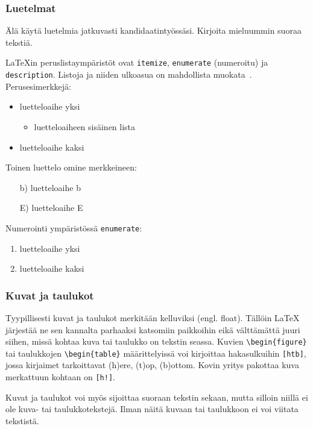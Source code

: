 \subsubsection{Luetelmat}
\label{sec:esimluettelo}

Älä käytä luetelmia jatkuvasti kandidaatintyössäsi. Kirjoita
mieluummin suoraa tekstiä.

\LaTeX{}in peruslistaympäristöt ovat \verb!itemize!, 
\verb!enumerate! (numeroitu)
ja \verb!description!. Listoja ja niiden ulkoasua on
mahdollista muokata~\citep[katso esim.][s. 128]{RefWorks:doc:601937178f0884cb02a8458c}. 
Perusesimerkkejä:
%
\begin{itemize}
\item luetteloaihe yksi
 \begin{itemize}
 \item luetteloaiheen sisäinen lista
 \end{itemize}
\item luetteloaihe kaksi
\end{itemize}

Toinen luettelo omine merkkeineen:
%
\begin{itemize}
\item[b)] luetteloaihe b
\item[E)] luetteloaihe E
\end{itemize}

Numerointi ympäristössä \verb!enumerate!:
%
\begin{enumerate}
\item luetteloaihe yksi
\item luetteloaihe kaksi
\end{enumerate}

\subsubsection{Kuvat ja taulukot}
\label{sec:esimviitteet}

Tyypillisesti kuvat ja taulukot merkitään kelluviksi
(engl. float). Tällöin \LaTeX{} järjestää ne sen kannalta parhaaksi
katsomiin paikkoihin eikä välttämättä juuri siihen, missä kohtaa kuva
tai taulukko on tekstin seassa. Kuvien \verb!\begin{figure}! tai
taulukkojen \verb!\begin{table}! määrittelyissä voi kirjoittaa
hakasulkuihin \verb![htb]!, jossa kirjaimet tarkoittavat (h)ere,
(t)op, (b)ottom.  Kovin yritys pakottaa kuva merkattuun kohtaan on
\verb-[h!]-.

Kuvat ja taulukot voi myös sijoittaa suoraan tekstin sekaan, mutta 
silloin niillä ei ole kuva- tai taulukkotekstejä. Ilman näitä
kuvaan tai taulukkoon ei voi viitata tekstistä.

